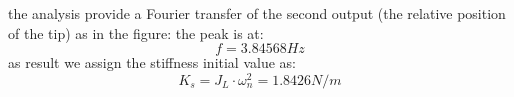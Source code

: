             the analysis provide a Fourier transfer of the second output (the relative position of the tip) as in the figure:
            the peak is at:
            \[
                f = 3.84568 Hz\]
            as result we assign the stiffness initial value as:
            \[
                    K_s = J_L \cdot \omega_n^2 = 1.8426 N/m \]

            